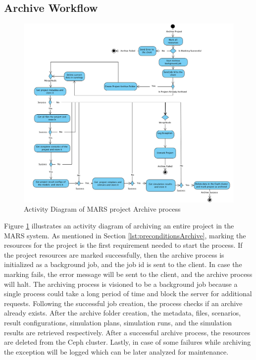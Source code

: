 \subsection{Archive Workflow}
\begin{figure}[H]
    \centering \includegraphics[scale=0.45]{grafiken/archiveActivity.png}
    \caption{Activity Diagram of MARS project Archive process}
    \label{fig:archiveActivity}
\end{figure}

Figure \ref{fig:archiveActivity} illustrates an activity diagram of archiving an entire project in the MARS system. As mentioned in Section \ref{lst:preconditionsArchive},
marking the resources for the project is the first requirement needed to start the process. If the project resources are marked successfully,
then the archive process is initialized as a background job, and the job id is sent to the client. In case the marking fails, the error message will be 
sent to the client, and the archive process will halt. The archiving process is visioned to be a background job because a single process could take
a long period of time and block the server for additional requests. Following the successful job creation, the process checks if an archive already
exists. After
the archive folder creation, the metadata, files, scenarios, result configurations, simulation plans, simulation runs, and the simulation results are retrieved respectively.
After a successful archive process, the resources are deleted from the Ceph cluster. Lastly, in case of some failures while archiving the exception will be logged 
which can be later analyzed for maintenance.

